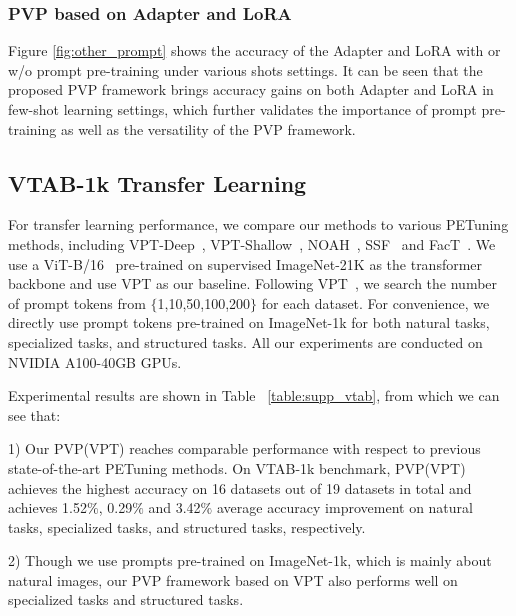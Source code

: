 \documentclass[10pt,journal,letterpaper,compsoc]{IEEEtran}
\begin{document}
\subsubsection{PVP based on Adapter and LoRA}\label{section:sec4.3.2}

Figure \ref{fig:other_prompt} shows the accuracy of the Adapter and LoRA with or w/o prompt pre-training under various shots settings. It can be seen that the proposed PVP framework brings accuracy gains on both Adapter and LoRA in few-shot learning settings, which further validates the importance of prompt pre-training as well as the versatility of the PVP framework.

\subsection{VTAB-1k Transfer Learning}
For transfer learning performance, we compare our methods to various PETuning methods, including VPT-Deep~\cite{vpt}, VPT-Shallow~\cite{vpt}, NOAH~\cite{NOAH}, SSF~\cite{SSF} and FacT~\cite{FacT}. We use a ViT-B/16~\cite{vit} pre-trained on supervised ImageNet-21K as the transformer backbone and use VPT as our baseline. Following VPT~\cite{vpt}, we search the number of prompt tokens from $\{$1,10,50,100,200$\}$ for each dataset. For convenience, we directly use prompt tokens pre-trained on ImageNet-1k for both natural tasks, specialized tasks, and structured tasks. All our experiments are conducted on NVIDIA A100-40GB GPUs.


Experimental results are shown in Table ~\ref{table:supp_vtab}, from which we can see that:

1) Our PVP(VPT) reaches comparable performance with respect to previous state-of-the-art PETuning methods. On VTAB-1k benchmark, PVP(VPT) achieves the highest accuracy on 16 datasets out of 19 datasets in total and achieves 1.52$\%$, 0.29$\%$ and 3.42$\%$ average accuracy improvement on natural tasks, specialized tasks, and structured tasks, respectively.

2) Though we use prompts pre-trained on ImageNet-1k, which is mainly about natural images, our PVP framework based on VPT also performs well on specialized tasks and structured tasks.
\end{document}
